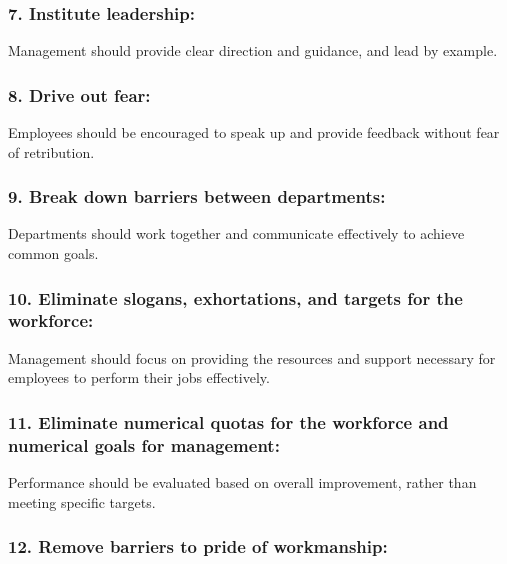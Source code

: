 \documentclass[11pt]{article}
\begin{document}
\hypertarget{institute-leadership}{%
\subsubsection{7. Institute leadership:}\label{institute-leadership}}

Management should provide clear direction and guidance, and lead by
example.

\hypertarget{drive-out-fear}{%
\subsubsection{8. Drive out fear:}\label{drive-out-fear}}

Employees should be encouraged to speak up and provide feedback without
fear of retribution.

\hypertarget{break-down-barriers-between-departments}{%
\subsubsection{9. Break down barriers between
departments:}\label{break-down-barriers-between-departments}}

Departments should work together and communicate effectively to achieve
common goals.

\hypertarget{eliminate-slogans-exhortations-and-targets-for-the-workforce}{%
\subsubsection{10. Eliminate slogans, exhortations, and targets for the
workforce:}\label{eliminate-slogans-exhortations-and-targets-for-the-workforce}}

Management should focus on providing the resources and support necessary
for employees to perform their jobs effectively.

\hypertarget{eliminate-numerical-quotas-for-the-workforce-and-numerical-goals-for-management}{%
\subsubsection{11. Eliminate numerical quotas for the workforce and
numerical goals for
management:}\label{eliminate-numerical-quotas-for-the-workforce-and-numerical-goals-for-management}}

Performance should be evaluated based on overall improvement, rather
than meeting specific targets.

\hypertarget{remove-barriers-to-pride-of-workmanship}{%
\subsubsection{12. Remove barriers to pride of
workmanship:}\label{remove-barriers-to-pride-of-workmanship}}
\end{document}
